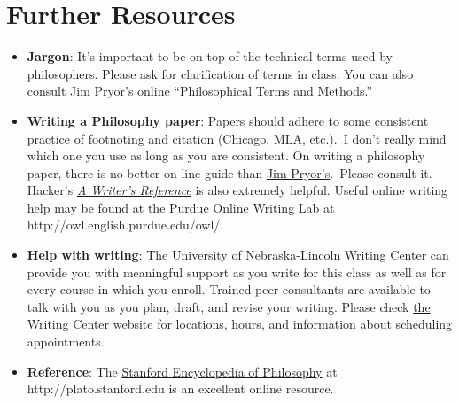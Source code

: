 \documentclass[12pt]{article}
\begin{document}
  \section*{Further Resources}
  \begin{itemize}
  \item \textbf{Jargon}: It's important to be on top of the technical terms used by philosophers. Please ask for clarification of terms in class. You can also consult Jim Pryor's online \href{http://www.jimpryor.net/teaching/vocab/index.html}{“Philosophical Terms and Methods.”}
  \item \textbf{Writing a Philosophy paper}: Papers should adhere to some consistent practice of footnoting and citation (Chicago, MLA, etc.). I don't really mind which one you use as long as you are consistent. On writing a philosophy paper, there is no better on-line guide than \href{http://www.jimpryor.net/teaching/guidelines/writing.html}{Jim Pryor’s}. Please consult it. Hacker’s \href{http://www.amazon.com/Writers-Reference-Exercises-Diana-Hacker/dp/0312601476/ref=sr_1_1?ie=UTF8&qid=1374423680&sr=8-1&keywords=hacker+a+writer%27s+reference}{\emph{A Writer’s Reference}} is also extremely helpful. Useful online writing help may be found at the \href{http://owl.english.purdue.edu/owl/}{Purdue Online Writing Lab} at http://owl.english.purdue.edu/owl/.
  \item \textbf{Help with writing}: The University of Nebraska-Lincoln Writing Center can provide you with meaningful support as you write for this class as well as for every course in which you enroll. Trained peer consultants are available to talk with you as you plan, draft, and revise your writing. Please check \href{http://www.unl.edu/writing/}{the Writing Center website} for locations, hours, and information about scheduling appointments.

  \item \textbf{Reference}: The \href{http://plato.stanford.edu}{Stanford Encyclopedia of Philosophy} at http://plato.stanford.edu is an excellent online resource. 
  \end{itemize}


\end{document}
